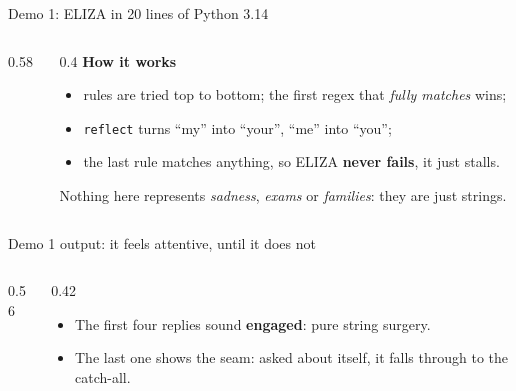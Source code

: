 \begin{frame}[fragile]{Demo 1: ELIZA in 20 lines of Python 3.14}
\begin{columns}[T]
\begin{column}{0.58\textwidth}
\end{column}
\begin{column}{0.4\textwidth}
\small
\textbf{How it works}
\begin{itemize}\setlength\itemsep{2pt}
\item rules are tried top to bottom; the first regex that \emph{fully matches} wins;
\item \texttt{reflect} turns ``my'' into ``your'', ``me'' into ``you'';
\item the last rule matches anything, so ELIZA \textbf{never fails}, it just stalls.
\end{itemize}
{\footnotesize Nothing here represents \emph{sadness}, \emph{exams} or \emph{families}: they are just strings.}
\end{column}
\end{columns}
\end{frame}

\begin{frame}[fragile]{Demo 1 output: it feels attentive, until it does not}
\begin{columns}[T]
\begin{column}{0.56\textwidth}
\end{column}
\begin{column}{0.42\textwidth}
\small
\begin{itemize}\setlength\itemsep{3pt}
\item The first four replies sound \textbf{engaged}: pure string surgery.
\item The last one shows the seam: asked about itself, it falls through to the catch-all.
\end{itemize}
\vspace{1mm}
\end{column}
\end{columns}
\end{frame}

